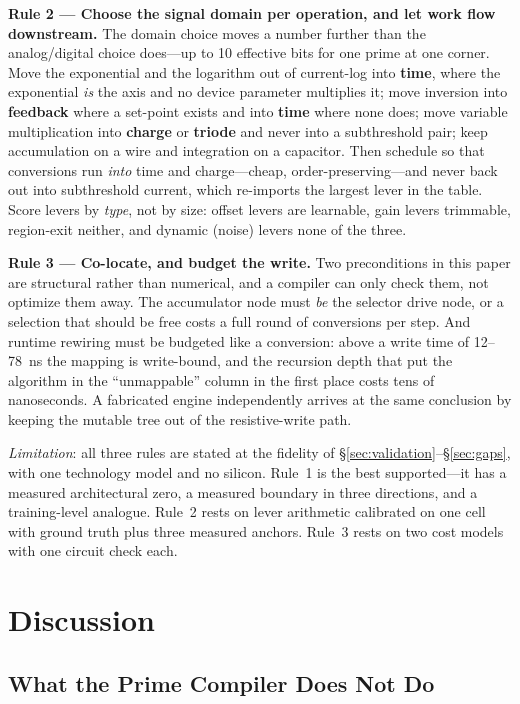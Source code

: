 \documentclass[11pt]{article}
\begin{document}
\textbf{Rule 2 --- Choose the signal domain per operation, and let work flow downstream.} The domain choice moves a number further than the analog/digital choice does---up to 10 effective bits for one prime at one corner. Move the exponential and the logarithm out of current-log into \textbf{time}, where the exponential \textit{is} the axis and no device parameter multiplies it; move inversion into \textbf{feedback} where a set-point exists and into \textbf{time} where none does; move variable multiplication into \textbf{charge} or \textbf{triode} and never into a subthreshold pair; keep accumulation on a wire and integration on a capacitor. Then schedule so that conversions run \textit{into} time and charge---cheap, order-preserving---and never back out into subthreshold current, which re-imports the largest lever in the table. Score levers by \textit{type}, not by size: offset levers are learnable, gain levers trimmable, region-exit neither, and dynamic (noise) levers none of the three.

\textbf{Rule 3 --- Co-locate, and budget the write.} Two preconditions in this paper are structural rather than numerical, and a compiler can only check them, not optimize them away. The accumulator node must \textit{be} the selector drive node, or a selection that should be free costs a full round of conversions per step. And runtime rewiring must be budgeted like a conversion: above a write time of 12--78~ns the mapping is write-bound, and the recursion depth that put the algorithm in the ``unmappable'' column in the first place costs tens of nanoseconds. A fabricated engine independently arrives at the same conclusion by keeping the mutable tree out of the resistive-write path.

\textit{Limitation}: all three rules are stated at the fidelity of \S\ref{sec:validation}--\S\ref{sec:gaps}, with one technology model and no silicon. Rule~1 is the best supported---it has a measured architectural zero, a measured boundary in three directions, and a training-level analogue. Rule~2 rests on lever arithmetic calibrated on one cell with ground truth plus three measured anchors. Rule~3 rests on two cost models with one circuit check each.

\section{Discussion}

\subsection{What the Prime Compiler Does Not Do}
\end{document}
